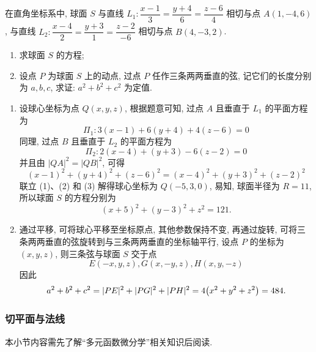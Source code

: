 \begin{example}
    在直角坐标系中, 球面 $S$ 与直线 $L_1:\dfrac{x-1}{3}=\dfrac{y+4}{6}=\dfrac{z-6}{4}$ 相切与点 $A(1,-4,6)$, 与直线 $L_2:\dfrac{x-4}{2}=\dfrac{y+3}{1}=\dfrac{z-2}{-6}$ 相切与点 $B(4,-3,2)$.
    \begin{enumerate}[label=(\arabic{*})]
        \item 求球面 $S$ 的方程;
        \item 设点 $P$ 为球面 $S$ 上的动点, 过点 $P$ 任作三条两两垂直的弦, 记它们的长度分别为 $a,b,c$, 求证: $a^2+b^2+c^2$ 为定值.
    \end{enumerate}
\end{example}
\begin{solution}
    \begin{enumerate}[label=(\arabic{*})]
        \item 设球心坐标为点 $Q(x,y,z)$, 根据题意可知, 过点 $A$ 且垂直于 $L_1$ 的平面方程为 
        \begin{equation*}
            \Pi_1:3(x-1)+6(y+4)+4(z-6)=0
            \tag*{(1)}
        \end{equation*}
        同理, 过点 $B$ 且垂直于 $L_2$ 的平面方程为 
        \begin{equation*}
            \Pi_2:2(x-4)+(y+3)-6(z-2)=0
            \tag*{(2)}
        \end{equation*}
        并且由 $|QA|^2=|QB|^2$, 可得
        \begin{equation*}
            (x-1)^2+(y+4)^2+(z-6)^2=(x-4)^2+(y+3)^2+(z-2)^2
            \tag*{(3)}
        \end{equation*}
        联立 (1)、(2) 和 (3) 解得球心坐标为 $Q(-5,3,0)$, 易知, 球面半径为 $R=11$, 所以球面 $S$ 的方程分别为
        $$(x+5)^2+(y-3)^2+z^2=121.$$
        \item 通过平移, 可将球心平移至坐标原点, 其他参数保持不变, 再通过旋转, 可将三条两两垂直的弦旋转到与三条两两垂直的坐标轴平行, 
        设点 $P$ 的坐标为 $(x,y,z)$, 则三条弦与球面 $S$ 交于点 $$E(-x,y,z),G(x,-y,z),H(x,y,-z)$$
        因此 $$a^2+b^2+c^2=|PE|^2+|PG|^2+|PH|^2=4\qty(x^2+y^2+z^2)=484.$$
    \end{enumerate}
\end{solution}

\subsubsection{切平面与法线}

本小节内容需先了解“多元函数微分学”相关知识后阅读.

